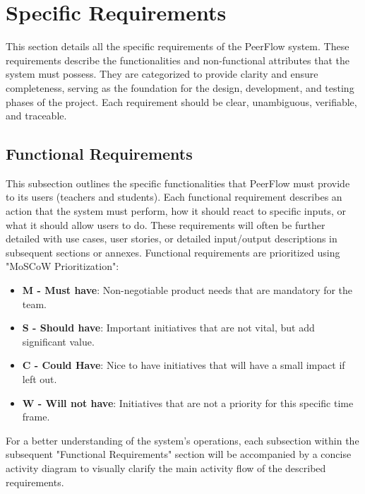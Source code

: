 \chapter{Specific Requirements}

\begin{justify}
    This section details all the specific requirements of the PeerFlow system. These requirements describe the functionalities and non-functional attributes that the system must possess. They are categorized to provide clarity and ensure completeness, serving as the foundation for the design, development, and testing phases of the project. Each requirement should be clear, unambiguous, verifiable, and traceable.
\end{justify}


\section{Functional Requirements}

\begin{justify}
   This subsection outlines the specific functionalities that PeerFlow must provide to its users (teachers and students). Each functional requirement describes an action that the system must perform, how it should react to specific inputs, or what it should allow users to do. These requirements will often be further detailed with use cases, user stories, or detailed input/output descriptions in subsequent sections or annexes. Functional requirements are prioritized using "MoSCoW Prioritization":
   \begin{itemize}
       \item \textbf{M - Must have}: Non-negotiable product needs that are mandatory for the team.
       \item \textbf{S - Should have}: Important initiatives that are not vital, but add significant value.
       \item  \textbf{C - Could Have}: Nice to have initiatives that will have a small impact if left out.
       \item \textbf{W - Will not have}: Initiatives that are not a priority for this specific time frame.
   \end{itemize}
\end{justify}

\begin{justify}
    For a better understanding of the system's operations, each subsection within the subsequent "Functional Requirements" section will be accompanied by a concise activity diagram to visually clarify the main activity flow of the described requirements.
\end{justify}

